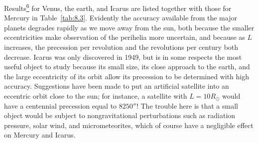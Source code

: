 Results\hyperref[ch8-ref-6]{\textsuperscript{6}} for Venus, the earth, and
Icarus are listed together with those for Mercury in
Table~\ref{tab:8.3}. Evidently the accuracy available from the major
planets degrades rapidly as we move away from the sun, both because the
smaller eccentricities make observation of the perihelia more uncertain,
and because as \(L\) increases, the precession per revolution and the
revolutions per century both decrease. Icarus was only discovered in 1949,
but is in some respects the most useful object to study because its small
size, its close approach to the earth, and the large eccentricity of its
orbit allow its precession to be determined with high accuracy. Suggestions
have been made to put an artificial satellite into an eccentric orbit close
to the sun; for instance, a satellite with \(L=10R_\odot\) would have a
centennial precession equal to \(8250''\)! The trouble here is that a small
object would be subject to nongravitational perturbations such as radiation
pressure, solar wind, and micrometeorites, which of course have a negligible
effect on Mercury and Icarus.

